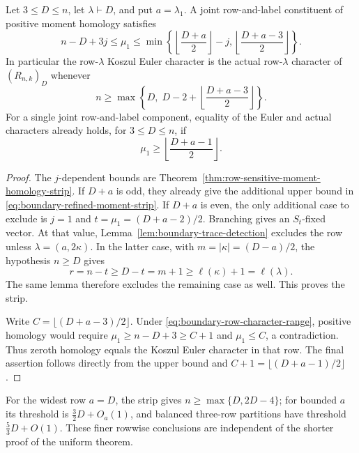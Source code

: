 \begin{corollary}
\label{cor:boundary-row-character-range}
Let $3\le D\le n$, let $\lambda\vdash D$, and put
$a=\lambda_1$.  A joint row-and-label constituent of positive
moment homology satisfies
\begin{equation}\label{eq:boundary-refined-moment-strip}
 n-D+3j\le\mu_1\le
 \min\left\{
       \left\lfloor\frac{D+a}{2}\right\rfloor-j,
       \left\lfloor\frac{D+a-3}{2}\right\rfloor
       \right\}.
\end{equation}
In particular the row-$\lambda$ Koszul Euler character is the
actual row-$\lambda$ character of $(R_{n,k})_D$ whenever
\begin{equation}\label{eq:boundary-row-character-range}
 n\ge\max\left\{D,\;
          D-2+\left\lfloor\frac{D+a-3}{2}\right\rfloor\right\}.
\end{equation}
For a single joint row-and-label component, equality of the Euler
and actual characters already holds, for $3\le D\le n$, if
\begin{equation}\label{eq:boundary-row-label-character-range}
                  \mu_1\ge
                      \left\lfloor\frac{D+a-1}{2}\right\rfloor.
\end{equation}
\end{corollary}

\begin{proof}
The $j$-dependent bounds are
Theorem~\ref{thm:row-sensitive-moment-homology-strip}.
If $D+a$ is odd, they already give the additional upper bound
in \eqref{eq:boundary-refined-moment-strip}.  If $D+a$ is even,
the only additional case to exclude is $j=1$ and
$t=\mu_1=(D+a-2)/2$.  Branching gives an $S_t$-fixed vector.
At that value, Lemma~\ref{lem:boundary-trace-detection} excludes
the row unless $\lambda=(a,2\kappa)$.  In the latter case,
with $m=|\kappa|=(D-a)/2$, the hypothesis $n\ge D$ gives
\[
       r=n-t\ge D-t=m+1\ge\ell(\kappa)+1=\ell(\lambda).
\]
The same lemma therefore excludes the remaining case as well.
This proves the strip.

Write $C=\lfloor(D+a-3)/2\rfloor$.  Under
\eqref{eq:boundary-row-character-range}, positive homology would
require $\mu_1\ge n-D+3\ge C+1$ and $\mu_1\le C$,
a contradiction.  Thus zeroth homology equals the Koszul Euler
character in that row.  The final assertion follows directly
from the upper bound and $C+1=\lfloor(D+a-1)/2\rfloor$.
\end{proof}

For the widest row $a=D$, the strip gives
$n\ge\max\{D,2D-4\}$; for bounded $a$ its threshold is
$\frac32D+O_a(1)$, and balanced three-row partitions have threshold
$\frac53D+O(1)$. These finer rowwise conclusions are independent of
the shorter proof of the uniform theorem.
